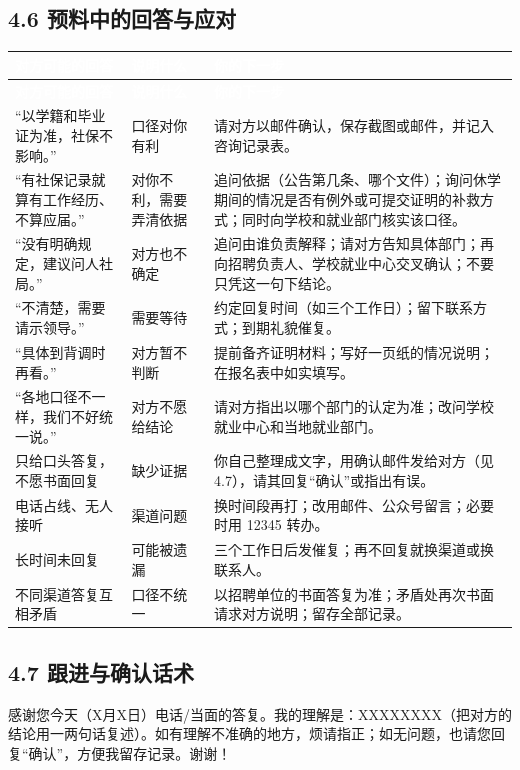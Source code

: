 \documentclass[UTF8,fontset=fandol,zihao=-4]{ctexart}
\newcommand{\lead}[1]{\par\Needspace{6\baselineskip}\vspace{0.3em}\noindent{\heiti\bfseries #1}\par}
\newcommand{\hc}[1]{\textcolor{white}{\heiti\bfseries #1}}
\begin{document}
\subsection{4.6 预料中的回答与应对}

\begingroup
{}
\begin{longtable}{@{}P{4.33cm}P{4.33cm}P{6.89cm}@{}}
\hc{对方可能的回答} & \hc{说明什么} & \hc{你的下一步}\\
\endfirsthead
{}\hc{对方可能的回答} & \hc{说明什么} & \hc{你的下一步}\\
\endhead
“以学籍和毕业证为准，社保不影响。” & 口径对你有利 & 请对方以邮件确认，保存截图或邮件，并记入咨询记录表。\\
“有社保记录就算有工作经历、不算应届。” & 对你不利，需要弄清依据 & 追问依据（公告第几条、哪个文件）；询问休学期间的情况是否有例外或可提交证明的补救方式；同时向学校和就业部门核实该口径。\\
“没有明确规定，建议问人社局。” & 对方也不确定 & 追问由谁负责解释；请对方告知具体部门；再向招聘负责人、学校就业中心交叉确认；不要只凭这一句下结论。\\
“不清楚，需要请示领导。” & 需要等待 & 约定回复时间（如三个工作日）；留下联系方式；到期礼貌催复。\\
“具体到背调时再看。” & 对方暂不判断 & 提前备齐证明材料；写好一页纸的情况说明；在报名表中如实填写。\\
“各地口径不一样，我们不好统一说。” & 对方不愿给结论 & 请对方指出以哪个部门的认定为准；改问学校就业中心和当地就业部门。\\
只给口头答复，不愿书面回复 & 缺少证据 & 你自己整理成文字，用确认邮件发给对方（见 4.7），请其回复“确认”或指出有误。\\
电话占线、无人接听 & 渠道问题 & 换时间段再打；改用邮件、公众号留言；必要时用 12345 转办。\\
长时间未回复 & 可能被遗漏 & 三个工作日后发催复；再不回复就换渠道或换联系人。\\
不同渠道答复互相矛盾 & 口径不统一 & 以招聘单位的书面答复为准；矛盾处再次书面请求对方说明；留存全部记录。\\
\end{longtable}
\endgroup

\subsection{4.7 跟进与确认话术}

\lead{确认回复模板（口头答复后发出）}

\begin{quotebox}
感谢您今天（X月X日）电话/当面的答复。我的理解是：XXXXXXXX（把对方的结论用一两句话复述）。如有理解不准确的地方，烦请指正；如无问题，也请您回复“确认”，方便我留存记录。谢谢！
\end{quotebox}
\end{document}
